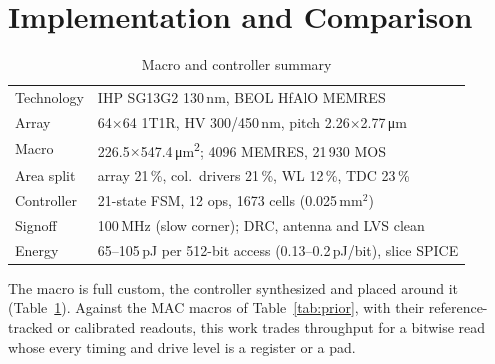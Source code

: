 \section{Implementation and Comparison}
\label{sec:impl}
\begin{table}[!t]
\centering
\caption{Macro and controller summary}
\label{tab:impl}
\setlength{\tabcolsep}{4pt}
\begin{tabular}{@{}ll@{}}
\toprule
Technology & IHP SG13G2 130\,nm, BEOL HfAlO MEMRES\\
Array & 64$\times$64 1T1R, HV 300/450\,nm, pitch 2.26$\times$2.77\,\si{\micro\meter}\\
Macro & 226.5$\times$547.4\,\si{\micro\meter\squared}; 4096 MEMRES, 21\,930 MOS\\
Area split & array 21\,\%, col.\ drivers 21\,\%, WL 12\,\%, TDC 23\,\%\\

Controller & 21-state FSM, 12 ops, 1673 cells (0.025\,mm$^2$)\\
Signoff & 100\,MHz (slow corner); DRC, antenna and LVS clean\\
Energy & 65--105\,pJ per 512-bit access (0.13--0.2\,pJ/bit), slice SPICE\\
\bottomrule
\end{tabular}
\end{table}
\begin{table}[!t]
\centering
\caption{Comparison with RRAM and time-domain CIM macros}
\label{tab:prior}
\scriptsize
\setlength{\tabcolsep}{2pt}

\end{table}
The macro is full custom, the controller synthesized and placed around it
(Table~\ref{tab:impl}). Against the MAC macros of Table~\ref{tab:prior}, with their
reference-tracked or calibrated readouts, this work trades throughput for a bitwise read whose
every timing and drive level is a register or a pad.
